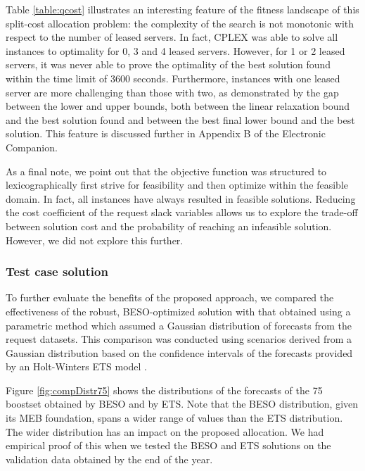\documentclass[ijoc,sglanonrev]{informs4}
\begin{document}
Table \ref{table:qcost} illustrates an interesting feature of the fitness landscape of this split-cost allocation problem: the complexity of the search is not monotonic with respect to the number of leased servers. In fact, CPLEX was able to solve all instances to optimality for 0, 3 and 4 leased servers. However, for 1 or 2 leased servers, it was never able to prove the optimality of the best solution found within the time limit of 3600 seconds. Furthermore, instances with one leased server are more challenging than those with two, as demonstrated by the gap between the lower and upper bounds, both between the linear relaxation bound and the best solution found and between the best final lower bound and the best solution. This feature is discussed further in Appendix B of the Electronic Companion.

As a final note, we point out that the objective function was structured to lexicographically first strive for feasibility and then optimize within the feasible domain. In fact, all instances have always resulted in feasible solutions. Reducing the cost coefficient of the request slack variables allows us to explore the trade-off between solution cost and the probability of reaching an infeasible solution. However, we did not explore this further.

\subsubsection*{Test case solution}

To further evaluate the benefits of the proposed approach, we compared the effectiveness of the robust, BESO-optimized solution with that obtained using a parametric method which assumed a Gaussian distribution of forecasts from the request datasets. This comparison was conducted using scenarios derived from a Gaussian distribution based on the confidence intervals of the forecasts provided by an Holt-Winters ETS model \citep{HKOS08}.

Figure \ref{fig:compDistr75} shows the distributions of the forecasts of the 75 boostset obtained by BESO and by ETS. Note that the BESO distribution, given its MEB foundation, spans a wider range of values than the ETS distribution.
The wider distribution has an impact on the proposed allocation. We had empirical proof of this when we tested the BESO and ETS solutions on the validation data obtained by the end of the year.
\end{document}

